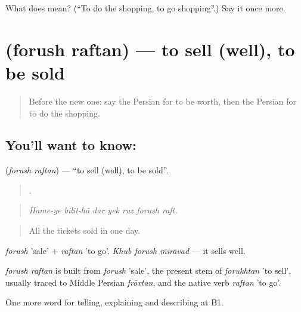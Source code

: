 \begin{tcolorbox}[breakable,colback=teal!4,colframe=teal!35!black,title={Before you move on}]
What does   mean? (\textquotedblleft{}To do the shopping, to go shopping\textquotedblright{}.) Say it once more.
\end{tcolorbox}
\section[\texorpdfstring{\fa{فروش} \fa{رفتن} (forush raftan)}{فروش رفتن (forush raftan)}]{  (forush raftan) — to sell (well), to be sold}

\label{lesson:FA-C462-forush-raftan}



\begin{quote}
Before the new one: say the Persian for to be worth, then the Persian for to do the shopping.
\end{quote}

\subsection*{You'll want to know:  }
\textbf{ } (\emph{forush raftan}) — \textquotedblleft{}to sell (well), to be sold\textquotedblright{}.

\begin{quote}
      .
\end{quote}

\begin{quote}
\emph{Hame-ye bilit-hâ dar yek ruz forush raft.}
\end{quote}

\begin{quote}
All the tickets sold in one day.
\end{quote}

\emph{forush} 'sale' + \emph{raftan} 'to go'. \emph{Khub forush miravad} — it sells well.

\begin{cousinweb}
\emph{forush raftan} is built from \emph{forush} 'sale', the present stem of \emph{forukhtan} 'to sell', usually traced to Middle Persian \emph{frōxtan}, and the native verb \emph{raftan} 'to go'.
\end{cousinweb}

\begin{grammarlens}[title={What you've built}]
One more word for telling, explaining and describing at B1.
\end{grammarlens}

